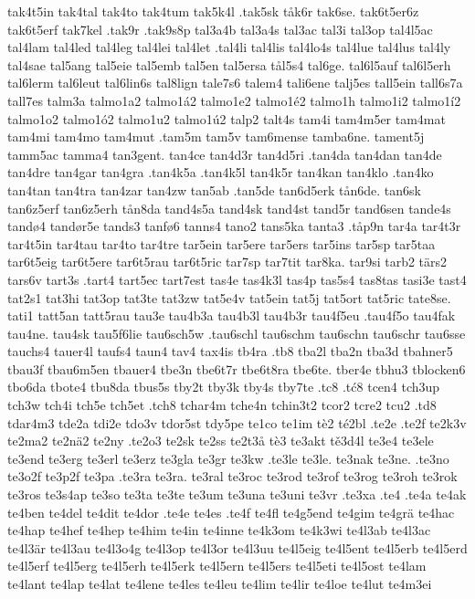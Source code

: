 {{tak4t5in
tak4tal
tak4to
tak4tum
tak5k4l
.tak5sk
tåk6r
tak6se.
tak6t5er6z
tak6t5erf
tak7kel
.tak9r
.tak9s8p
tal3a4b
tal3a4s
tal3ac
tal3i
tal3op
tal4l5ac
tal4lam
tal4led
tal4leg
tal4lei
tal4let
.tal4li
tal4lis
tal4lo4s
tal4lue
tal4lus
tal4ly
tal4sae
tal5ang
tal5eie
tal5emb
tal5en
tal5ersa
tål5s4
tal6ge.
tal6l5auf
tal6l5erh
tal6lerm
tal6leut
tal6lin6s
tal8lign
tale7s6
talem4
tali6ene
talj5es
tall5ein
tall6s7a
tall7es
talm3a
talmo1a2
talmo1á2
talmo1e2
talmo1é2
talmo1h
talmo1i2
talmo1í2
talmo1o2
talmo1ó2
talmo1u2
talmo1ú2
talp2
talt4s
tam4i
tam4m5er
tam4mat
tam4mi
tam4mo
tam4mut
.tam5m
tam5v
tam6mense
tamba6ne.
tament5j
tamm5ac
tamma4
tan3gent.
tan4ce
tan4d3r
tan4d5ri
.tan4da
tan4dan
tan4de
tan4dre
tan4gar
tan4gra
.tan4k5a
.tan4k5l
tan4k5r
tan4kan
tan4klo
.tan4ko
tan4tan
tan4tra
tan4zar
tan4zw
tan5ab
.tan5de
tan6d5erk
tån6de.
tan6sk
tan6z5erf
tan6z5erh
tån8da
tand4s5a
tand4sk
tand4st
tand5r
tand6sen
tande4s
tandø4
tandør5e
tands3
tanfø6
tanns4
tano2
tans5ka
tanta3
.tåp9n
tar4a
tar4t3r
tar4t5in
tar4tau
tar4to
tar4tre
tar5ein
tar5ere
tar5ers
tar5ins
tar5sp
tar5taa
tar6t5eig
tar6t5ere
tar6t5rau
tar6t5ric
tar7sp
tar7tit
tar8ka.
tar9si
tarb2
tärs2
tars6v
tart3s
.tart4
tart5ec
tart7est
tas4e
tas4k3l
tas4p
tas5s4
tas8tas
tasi3e
tast4
tat2s1
tat3hi
tat3op
tat3te
tat3zw
tat5e4v
tat5ein
tat5j
tat5ort
tat5ric
tate8se.
tati1
tatt5an
tatt5rau
tau3e
tau4b3a
tau4b3l
tau4b3r
tau4f5eu
.tau4f5o
tau4fak
tau4ne.
tau4sk
tau5f6lie
tau6sch5w
.tau6schl
tau6schm
tau6schn
tau6schr
tau6sse
tauchs4
tauer4l
taufs4
taun4
tav4
tax4is
tb4ra
.tb8
tba2l
tba2n
tba3d
tbahner5
tbau3f
tbau6m5en
tbauer4
tbe3n
tbe6t7r
tbe6t8ra
tbe6te.
tber4e
tbhu3
tblocken6
tbo6da
tbote4
tbu8da
tbus5s
tby2t
tby3k
tby4s
tby7te
.tc8
.tć8
tcen4
tch3up
tch3w
tch4i
tch5e
tch5et
.tch8
tchar4m
tche4n
tchin3t2
tcor2
tcre2
tcu2
.td8
tdar4m3
tde2a
tdi2e
tdo3v
tdor5st
tdy5pe
te1co
te1im
tè2
té2bl
.te2e
.te2f
te2k3v
te2ma2
te2nä2
te2ny
.te2o3
te2sk
te2ss
te2t3å
tè3
te3akt
tě3d4l
te3e4
te3ele
te3end
te3erg
te3erl
te3erz
te3gla
te3gr
te3kw
.te3le
te3le.
te3nak
te3ne.
.te3no
te3o2f
te3p2f
te3pa
.te3ra
te3ra.
te3ral
te3roc
te3rod
te3rof
te3rog
te3roh
te3rok
te3ros
te3s4ap
te3so
te3ta
te3te
te3um
te3una
te3uni
te3vr
.te3xa
.te4
.te4a
te4ak
te4ben
te4del
te4dit
te4dor
.te4e
te4es
.te4f
te4fl
te4g5end
te4gim
te4grä
te4hac
te4hap
te4hef
te4hep
te4him
te4in
te4inne
te4k3om
te4k3wi
te4l3ab
te4l3ac
te4l3är
te4l3au
te4l3o4g
te4l3op
te4l3or
te4l3uu
te4l5eig
te4l5ent
te4l5erb
te4l5erd
te4l5erf
te4l5erg
te4l5erh
te4l5erk
te4l5ern
te4l5ers
te4l5eti
te4l5ost
te4lam
te4lant
te4lap
te4lat
te4lene
te4les
te4leu
te4lim
te4lir
te4loe
te4lut
te4m3ei
}}
